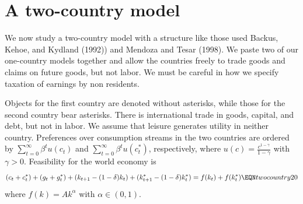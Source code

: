 \section{A two-country model}

We now study a  two-country  model with a structure like those used  Backus, Kehoe, and Kydland (1992))  and  Mendoza and Tesar (1998).
We paste two of our one-country models  together and allow the countries  freely to trade goods and  claims on future goods, but not labor.  %
 We must  be careful in how we specify taxation of earnings by non residents. %
%
%

 Objects for  the first country are denoted without asterisks, while those for the second country
bear asterisks.  There is international trade in goods, capital, and debt, but not in labor.  We assume that leisure generates utility in neither
country. Preferences over consumption streams in the two countries are ordered by $\sum_{t=0}^\infty \beta^t u(c_t)$ and $\sum_{t=0}^\infty \beta^t u(c_t^*)$, respectively,
where $u(c) = {\frac{c^{1-\gamma}}{1-\gamma}}$ with $\gamma > 0$.  Feasibility
for the world economy is
$$ (c_t+c_t^*) + (g_t + g_t^*) + (k_{t+1} - (1-\delta ) k_t ) + (k_{t+1}^* - (1-\delta ) k_t^* ) = f(k_t) + f(k_t^*) \EQN twocountry20 $$
where $f(k) = A k^\alpha$ with $\alpha \in (0,1)$.

